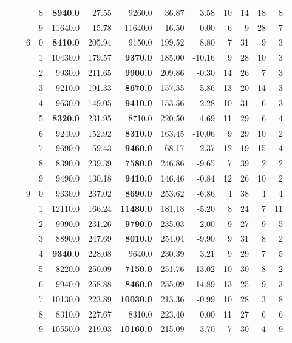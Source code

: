 {\begin{longtable}{llcc|rr|rrr|rrrr}
 &  &  & 8 & \textbf{8940.0} & 27.55 & 9260.0 & 36.87 & 3.58 & 10 & 14 & 18 & 8 \\
 &  &  & 9 & 11640.0 & 15.78 & 11640.0 & 16.50 & 0.00 & 6 & 9 & 28 & 7 \\ \hline
 &  & 6 & 0 & \textbf{8410.0} & 205.94 & 9150.0 & 199.52 & 8.80 & 7 & 31 & 9 & 3 \\
 &  &  & 1 & 10430.0 & 179.57 & \textbf{9370.0} & 185.00 & -10.16 & 9 & 28 & 10 & 3 \\
 &  &  & 2 & 9930.0 & 211.65 & \textbf{9900.0} & 209.86 & -0.30 & 14 & 26 & 7 & 3 \\
 &  &  & 3 & 9210.0 & 191.33 & \textbf{8670.0} & 157.55 & -5.86 & 13 & 20 & 14 & 3 \\
 &  &  & 4 & 9630.0 & 149.05 & \textbf{9410.0} & 153.56 & -2.28 & 10 & 31 & 6 & 3 \\
 &  &  & 5 & \textbf{8320.0} & 231.95 & 8710.0 & 220.50 & 4.69 & 11 & 29 & 6 & 4 \\
 &  &  & 6 & 9240.0 & 152.92 & \textbf{8310.0} & 163.45 & -10.06 & 9 & 29 & 10 & 2 \\
 &  &  & 7 & 9690.0 & 59.43 & \textbf{9460.0} & 68.17 & -2.37 & 12 & 19 & 15 & 4 \\
 &  &  & 8 & 8390.0 & 239.39 & \textbf{7580.0} & 246.86 & -9.65 & 7 & 39 & 2 & 2 \\
 &  &  & 9 & 9490.0 & 130.18 & \textbf{9410.0} & 146.46 & -0.84 & 12 & 26 & 10 & 2 \\ \hline
 &  & 9 & 0 & 9330.0 & 237.02 & \textbf{8690.0} & 253.62 & -6.86 & 4 & 38 & 4 & 4 \\
 &  &  & 1 & 12110.0 & 166.24 & \textbf{11480.0} & 181.18 & -5.20 & 8 & 24 & 7 & 11 \\
 &  &  & 2 & 9990.0 & 231.26 & \textbf{9790.0} & 235.03 & -2.00 & 9 & 27 & 9 & 5 \\
 &  &  & 3 & 8890.0 & 247.69 & \textbf{8010.0} & 254.04 & -9.90 & 9 & 31 & 8 & 2 \\
 &  &  & 4 & \textbf{9340.0} & 228.08 & 9640.0 & 230.39 & 3.21 & 9 & 29 & 7 & 5 \\
 &  &  & 5 & 8220.0 & 250.09 & \textbf{7150.0} & 251.76 & -13.02 & 10 & 30 & 8 & 2 \\
 &  &  & 6 & 9940.0 & 258.88 & \textbf{8460.0} & 255.09 & -14.89 & 13 & 25 & 9 & 3 \\
 &  &  & 7 & 10130.0 & 223.89 & \textbf{10030.0} & 213.36 & -0.99 & 10 & 28 & 3 & 8 \\
 &  &  & 8 & 8310.0 & 227.67 & 8310.0 & 223.40 & 0.00 & 11 & 27 & 6 & 6 \\
 &  &  & 9 & 10550.0 & 219.03 & \textbf{10160.0} & 215.09 & -3.70 & 7 & 30 & 4 & 9 \\
\end{longtable}
}
